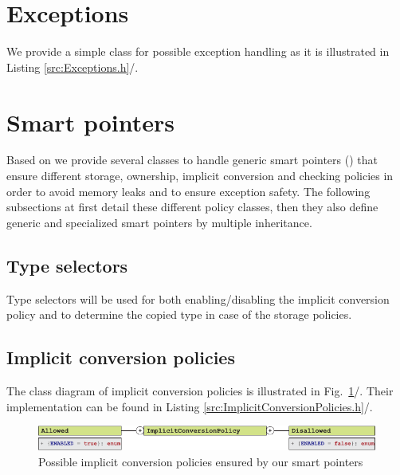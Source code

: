 \documentclass[b5paper, twosided]{book}
\newcommand{\CBlue}[1]{{\color[rgb]{0.0, 0.0, 0.9}{#1}}}
\DeclareRobustCommand{\mref}[1]{\ref{#1}{\relsize{-1}/\pageref{#1}}}
\begin{document}
\section{Exceptions}

We provide a simple class for possible exception handling as it is illustrated in Listing \mref{src:Exceptions.h}.


\section{Smart pointers}
Based on \citep{Alexandrescu2001} we provide several classes to handle generic smart pointers (\CBlue{SmartPointer}) that ensure different storage, ownership, implicit conversion and checking policies in order to avoid memory leaks and to ensure exception safety. The following subsections at first detail these different policy classes, then they also define generic and specialized smart pointers by multiple inheritance.

\subsection{Type selectors}

Type selectors will be used for both enabling/disabling the implicit conversion policy and to determine the copied type in case of the storage policies.


\subsection{Implicit conversion policies}

The class diagram of implicit conversion policies is illustrated in Fig.\ \mref{fig:UMLImplicitConversionPolicy}. Their implementation can be found in Listing \mref{src:ImplicitConversionPolicies.h}.

\begin{figure}[!h]
	\centering
	\includegraphics[]{images/UMLImplicitConversionPolicy.pdf}
	\caption{Possible implicit conversion policies ensured by our smart pointers}
	\label{fig:UMLImplicitConversionPolicy}
\end{figure}
\end{document}
